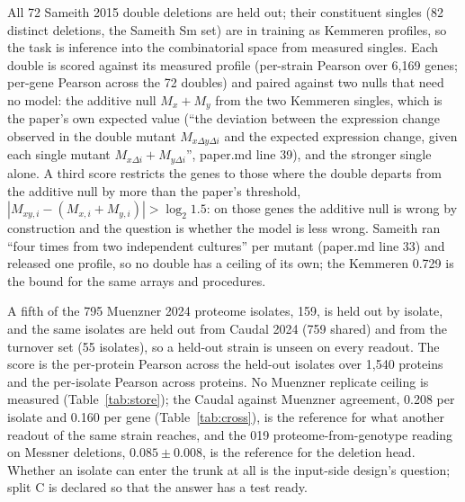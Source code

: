 All 72 Sameith 2015 double deletions are held out; their constituent singles (82
distinct deletions, the Sameith Sm set) are in training as Kemmeren profiles, so the task
is inference into the combinatorial space from measured singles. Each double is scored against its measured profile (per-strain Pearson
over 6{,}169 genes; per-gene Pearson across the 72 doubles) and paired against two nulls
that need no model: the additive null $M_x + M_y$ from the two Kemmeren singles, which is
the paper's own expected value (``the deviation between the expression change observed in
the double mutant $M_{x\Delta y\Delta i}$ and the expected expression change, given each
single mutant $M_{x\Delta i} + M_{y\Delta i}$'', paper.md line 39), and the stronger
single alone. A third score restricts the genes to those where the double departs from the
additive null by more than the paper's threshold, $|M_{xy,i} - (M_{x,i} + M_{y,i})| >
\log_2 1.5$: on those genes the additive null is wrong by construction and the question is
whether the model is less wrong. Sameith ran ``four times from two independent cultures''
per mutant (paper.md line 33) and released one profile, so no double has a ceiling of its
own; the Kemmeren 0.729 is the bound for the same arrays and procedures.

A fifth of the 795 Muenzner 2024 proteome isolates, 159, is held out by isolate, and the
same isolates are held out from Caudal 2024 (759 shared) and from the turnover set (55
isolates), so a held-out strain is unseen on every readout. The score is the per-protein
Pearson across the held-out isolates over 1{,}540 proteins and the per-isolate Pearson
across proteins. No Muenzner replicate ceiling is measured (Table~\ref{tab:store}); the
Caudal against Muenzner agreement, 0.208 per isolate and 0.160 per gene
(Table~\ref{tab:cross}), is the reference for what another readout of the same strain
reaches, and the 019 proteome-from-genotype reading on Messner deletions, $0.085 \pm
0.008$, is the reference for the deletion head. Whether an isolate can enter the trunk at
all is the input-side design's question; split C is declared so that the answer has a
test ready.

